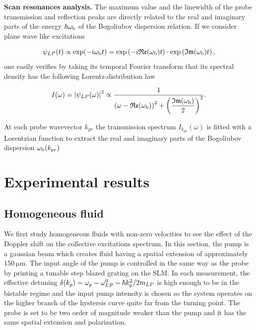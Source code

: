  \textbf{Scan resonances analysis.} The maximum value and the linewidth of the probe transmission and reflection peaks are directly related to the real and imaginary parts of the energy $\hbar \omega_{\mathrm{b}}$ of the Bogoliubov dispersion relation.
  If we consider plane wave like excitations

\begin{equation}
    \psi_{LP}(t) \propto \mathrm{exp} (-i \omega_{\mathrm{b}} t) = \mathrm{exp} \left (- i \mathfrak{Re} (\omega_{\mathrm{b}}) t \right ) \cdot \mathrm{exp} \left( \mathfrak{Im} (\omega_{\mathrm{b}}) t \right),
\end{equation}
one easily verifies by taking its temporal Fourier transform that its spectral density has the following Lorentz-distribution law

\begin{equation}
    I(\omega) = \abs{\psi_{LP}(\omega)}^2 \propto \dfrac{1}{ \left(\omega - \mathfrak{Re}(\omega_{\mathrm{b}}) \right)^2 + \left( \dfrac{\mathfrak{Im}(\omega_{\mathrm{b}})}{2} \right)^2}.
\end{equation}

At each probe wavevector $k_{pr}$ the transmission spectrum $I_{k_{pr}}(\omega)$ is fitted with a Lorentzian function to extract the real and imaginary parts of the Bogoliubov dispersion $\omega_{\mathrm{b}}(k_{pr})$
\section{Experimental results}

\subsection{Homogeneous fluid}

We first study homogeneous fluids with non-zero velocities to see the effect of the Doppler shift on the collective excitations spectrum. In this section,
the pump is a gaussian beam which creates fluid having a spatial extension of approximately $150 \ \mathrm{\mu m}$. The input angle of the pump
is controlled in the same way as the probe by printing a tunable step blazed grating on the SLM. In each measurement, the effective detuning 
$\delta(k_p)=\omega_p -\omega_{LP}^0- \hbar k_p^2/2m_{LP}$ is high enough to be in the bistable regime and the input pump intensity is chosen so the system operates on the higher branch of the hystersis curve quite far from the turning point. 
The probe is set to be two order of magnitude weaker than the pump and it has the same spatial extension and polarization.

